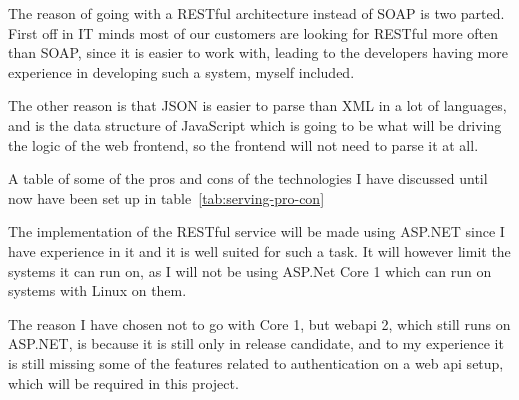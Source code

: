 The reason of going with a RESTful architecture instead of SOAP is two parted. First off in IT minds most of our customers are looking for RESTful more often than SOAP, since it is easier to work with, leading to the developers having more experience in developing such a system, myself included.

The other reason is that JSON is easier to parse than XML in a lot of languages, and is the data structure of  JavaScript which is going to be what will be driving the logic of the web frontend, so the frontend will not need to parse it at all.

A table of some of the pros and cons of the technologies I have discussed until now have been set up in table~\ref{tab:serving-pro-con}

The implementation of the RESTful service will be made using ASP.NET since I have experience in it and it is well suited for such a task. It will however limit the systems it can run on, as I will not be using ASP.Net Core 1 which can run on systems with Linux on them\cite{asp5:intro}.

The reason I have chosen not to go with Core 1, but webapi 2, which still runs on ASP.NET, is because it is still only in release candidate\cite{asp_core_1:roadmap}, and to my experience it is still missing some of the features related to authentication on a web api setup, which will be required in this project.

\begin{table}[h]
  \caption{Pros and cons of different ways of serving the data}
  \label{tab:serving-pro-con}
\end{table}

